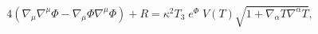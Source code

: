 \begin{equation}
4\left(\nabla_\mu\nabla^\mu\Phi-\nabla_\mu\Phi \nabla^\mu\Phi\right)+R
= \kappa^2T_3\;e^\Phi\;V(T)\sqrt{1+\nabla_\alpha T\nabla^\alpha T},
\label{dilaton1}
\end{equation}

